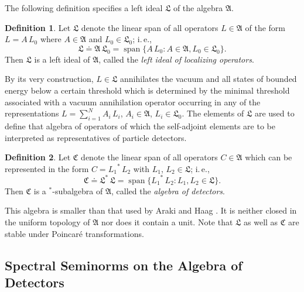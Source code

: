 \documentclass[a4paper,a4paper]{article}
\numberwithin{equation}{section}
\newcommand{\Afrak}{\mathfrak{A}}
\newcommand{\Cfrak}{\mathfrak{C}}
\newcommand{\Lfrak}{\mathfrak{L}}
\theoremstyle{definition}
\newtheorem{definition}{Definition}[section]
\theoremstyle{plain}
\theoremstyle{remark}
\DeclareMathOperator{\linhull}{span}
\newcommand{\bset}[1]{\bigl\{ #1 \bigr\}}
\begin{document}
  The following definition specifies a left ideal $\Lfrak$ of the
  algebra $\Afrak$.
  \begin{definition}
    \label{def:localizer-ideal}
    Let $\Lfrak$ denote the linear span of all operators $L \in
    \Afrak$ of the form $L = A \, L_0$ where $A \in \Afrak$ and $L_0
    \in \Lfrak_0$; i.\,e.,
    \begin{equation*}
      \Lfrak \doteq \Afrak \, \Lfrak_0 = \linhull \bset{A \, L_0 : A
      \in \Afrak , L_0 \in \Lfrak_0} \text{.}
    \end{equation*}
    Then $\Lfrak$ is a left ideal of $\Afrak$, called the \emph{left
    ideal of localizing operators}.
  \end{definition}
  By its very construction, $L \in \Lfrak$ annihilates the vacuum and
  all states of bounded energy below a certain threshold which is
  determined by the minimal threshold associated with a vacuum
  annihilation operator occurring in any of the representations $L =
  \sum_{i = 1}^N A_i \, L_i$, $A_i \in \Afrak$, $L_i \in \Lfrak_0$.
  The elements of $\Lfrak$ are used to define that algebra of
  operators of which the self-adjoint elements are to be interpreted
  as representatives of particle detectors.
  \begin{definition}
    \label{def:counter-algebra}
    Let $\Cfrak$ denote the linear span of all operators $C \in
    \Afrak$ which can be represented in the form $C = {L_1}^* \, L_2$
    with $L_1$, $L_2 \in \Lfrak$; i.\,e.,
    \begin{equation*}
      \Cfrak \doteq \Lfrak^* \, \Lfrak = \linhull \bset{{L_1}^* \, L_2
      : L_1 , L_2 \in \Lfrak} \text{.}
    \end{equation*}
    Then $\Cfrak$ is a $^*$-subalgebra of $\Afrak$, called the
    \emph{algebra of detectors}.
  \end{definition}
  This algebra is smaller than that used by Araki and Haag
  \cite{araki/haag:1967}. It is neither closed in the uniform topology
  of $\Afrak$ nor does it contain a unit. Note that $\Lfrak$ as well
  as $\Cfrak$ are stable under Poincar\'e transformations.

\subsection{Spectral Seminorms on the Algebra of Detectors}
  
\end{document}
